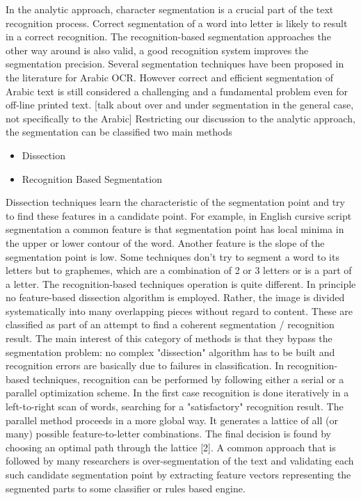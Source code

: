\documentclass[12pt,journal,compsoc]{IEEEtran}
\begin{document}
In the analytic approach, character segmentation is a crucial part of the text recognition process. Correct segmentation of a word into letter is likely to result in a correct recognition. The recognition-based segmentation approaches the other way around is also valid, a good recognition system improves the segmentation precision. Several segmentation techniques have been proposed in the literature for Arabic OCR. However correct and efficient segmentation of Arabic text is still considered a challenging and a fundamental problem even for off-line printed text.  
[talk about over and under segmentation in the general case, not specifically to the Arabic]
Restricting our discussion to the analytic approach, the segmentation can be classified two main methods
\begin{itemize}
  \item Dissection
  \item Recognition Based Segmentation
\end{itemize}
Dissection techniques learn the characteristic of the segmentation point and try to find these features in a candidate point. For example, in English cursive script segmentation a common feature is that segmentation point has local minima in the upper or lower contour of the word. Another feature is the slope of the segmentation point is low. Some techniques don't try to segment a word to its letters but to graphemes, which are a combination of 2 or 3 letters or is a part of a letter. The recognition-based techniques operation is quite different. In principle no feature-based dissection algorithm is employed. Rather, the image is divided systematically into many overlapping pieces without regard to content. These are classified as part of an attempt to find a coherent segmentation / recognition result. The main interest of this category of methods is that they bypass the segmentation problem: no complex "dissection" algorithm has to be built and recognition errors are basically due to failures in classification. In recognition-based techniques, recognition can be performed by following either a serial or a parallel optimization scheme. In the first case recognition is done iteratively in a left-to-right scan of words, searching for a "satisfactory" recognition result. The parallel method proceeds in a more global way. It generates a lattice of all (or many) possible feature-to-letter combinations. The final decision is found by choosing an optimal path through the lattice [2]. A common approach that is followed by many researchers is over-segmentation of the text and validating each such candidate segmentation point by extracting feature vectors representing the segmented parts to some classifier or rules based engine.\cite{daifallah2009recognition}
\end{document}
